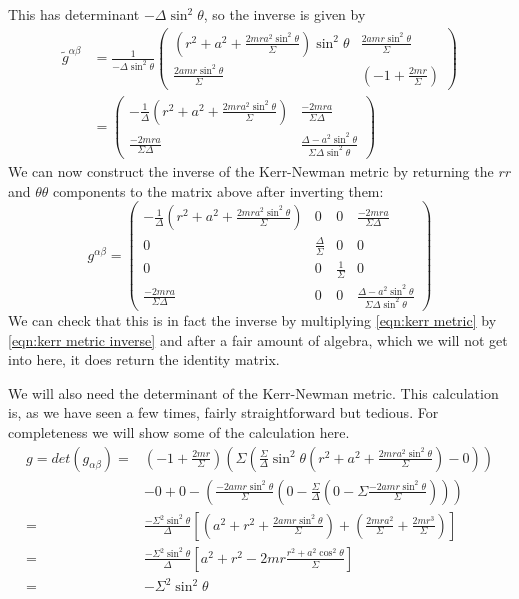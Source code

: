 \documentclass[11pt]{article}
\numberwithin{equation}{section}
\numberwithin{figure}{section}
\numberwithin{table}{section}
\begin{document}
This has determinant $-\Delta\sin^2\theta$, so the inverse is given by
\begin{align*}
    \tilde{g}^{\alpha\beta}&=\frac{1}{-\Delta\sin^2\theta}
    \begin{pmatrix}
        \left(r^2+a^2+\frac{2mra^2\sin^2\theta}{\Sigma}\right)\sin^2\theta & \frac{2amr\sin^2\theta}{\Sigma} \\
        \frac{2amr\sin^2\theta}{\Sigma} & (-1+\frac{2mr}{\Sigma})
    \end{pmatrix}\\
    &=
    \begin{pmatrix}
        -\frac{1}{\Delta}\left(r^2+a^2+\frac{2mra^2\sin^2\theta}{\Sigma}\right) & \frac{-2mra}{\Sigma\Delta} \\
        \frac{-2mra}{\Sigma\Delta} & \frac{\Delta-a^2\sin^2\theta}{\Sigma\Delta\sin^2\theta}
    \end{pmatrix}
\end{align*}
We can now construct the inverse of the Kerr-Newman metric by returning the $rr$ and $\theta\theta$ components to the matrix above after inverting them:
\begin{equation}
    g^{\alpha\beta}=
    \begin{pmatrix}
        -\frac{1}{\Delta}\left(r^2+a^2+\frac{2mra^2\sin^2\theta}{\Sigma}\right) & 0 & 0 & \frac{-2mra}{\Sigma\Delta} \\
        0 & \frac{\Delta}{\Sigma} & 0 & 0 \\
        0 & 0 & \frac{1}{\Sigma} & 0 \\
        \frac{-2mra}{\Sigma\Delta} & 0 & 0 & \frac{\Delta-a^2\sin^2\theta}{\Sigma\Delta\sin^2\theta}
    \end{pmatrix}
    \label{eqn:kerr metric inverse}
\end{equation}
We can check that this is in fact the inverse by multiplying \cref{eqn:kerr metric} by \cref{eqn:kerr metric inverse} and after a fair amount of algebra, which we will not get into here, it does return the identity matrix. 
\par We will also need the determinant of the Kerr-Newman metric. This calculation is, as we have seen a few times, fairly straightforward but tedious. For completeness we will show some of the calculation here.
\begin{align*}
    g=det(g_{\alpha\beta})=&(-1+\frac{2mr}{\Sigma})\left(\Sigma\left(\frac{\Sigma}{\Delta}\sin^2\theta\left(r^2+a^2+\frac{2mra^2\sin^2\theta}{\Sigma}\right)-0\right)\right)\\&-0+0-\left(\frac{-2amr\sin^2\theta}{\Sigma}\left(0-\frac{\Sigma}{\Delta}\left(0-\Sigma\frac{-2amr\sin^2\theta}{\Sigma}\right)\right)\right)\\
    =&\frac{-\Sigma^2\sin^2\theta}{\Delta}\left[\left(a^2+r^2+\frac{2amr\sin^2\theta}{\Sigma}\right)+\left(\frac{2mra^2}{\Sigma}+\frac{2mr^3}{\Sigma}\right)\right]\\
    =&\frac{-\Sigma^2\sin^2\theta}{\Delta}\left[a^2+r^2-2mr\frac{r^2+a^2\cos^2\theta}{\Sigma}\right]\\
    =&-\Sigma^2\sin^2\theta
\end{align*}
\end{document}
